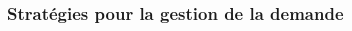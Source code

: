 \documentclass[french]{beamer}
\begin{document}
{\begin{frame}

\end{frame}
% 

\begin{frame}
\frametitle{Stratégies pour la gestion de la demande}
\begin{columns}[T]
\begin{column}[T]{0.5\linewidth}
\begin{overlayarea}{0.95\linewidth}{2.8in}
\end{overlayarea}
\end{column}


\end{columns}
\end{frame}}
\end{document}
